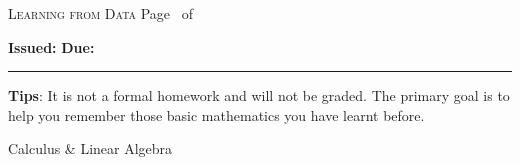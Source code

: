 \documentclass[a4paper, 12pt, answers]{exam} %
\begin{document}
\pagestyle{headandfoot}
\runningheadrule


\setcounter{psctr}{0} %

              {\textsc{Learning from Data}}
              { Page \thepage\ of \numpages}
\firstpagefooter{}{}{}
\runningfooter{}{}{}


\newenvironment{Sequation}
   {\stepcounter{Sequ}%
     \addtocounter{equation}{-1}%
     \renewcommand\theequation{S\arabic{Sequ}}\equation}
   {\endequation}

\centering

\centering
\renewcommand{\thequestion}{\arabic{psctr}.\arabic{question}}
\courseheader

\begin{flushleft}
  \textbf{Issued:}  \hfill
  \textbf{Due:}  
\end{flushleft}

\hrule 



\vspace{1em}



\begin{flushleft}
 \textbf{Tips}: It is not a formal homework and will not be graded. The primary goal is to help you remember those basic mathematics you have learnt before.
\end{flushleft}
\begin{center}
	Calculus \& Linear Algebra
\end{center}
\end{document}
